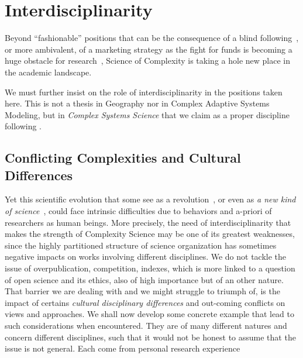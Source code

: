 \section*{Interdisciplinarity}





Beyond ``fashionable'' positions that can be the consequence of a blind following~\cite{dirk1999measure}, or more ambivalent, of a marketing strategy as the fight for funds is becoming a huge obstacle for research~\cite{bollen2014funding}, Science of Complexity is taking a hole new place in the academic landscape.


We must further insist on the role of interdisciplinarity in the positions taken here. This is not a thesis in Geography nor in Complex Adaptive Systems Modeling, but in \emph{Complex Systems Science} that we claim as a proper discipline following .



\subsection*{Conflicting Complexities and Cultural Differences}

Yet this scientific evolution that some see as a revolution~\cite{colander2003complexity}, or even as \emph{a new kind of science}~\cite{wolfram2002new}, could face intrinsic difficulties due to behaviors and a-priori of researchers as human beings. More precisely, the need of interdisciplinarity that makes the strength of Complexity Science may be one of its greatest weaknesses, since the highly partitioned structure of science organization has sometimes negative impacts on works involving different disciplines. We do not tackle the issue of overpublication, competition, indexes, which is more linked to a question of open science and its ethics, also of high importance but of an other nature. That barrier we are dealing with and we might struggle to triumph of, is the impact of certains \emph{cultural disciplinary differences} and out-coming conflicts on views and approaches. We shall now develop some concrete example that lead to such considerations when encountered. They are of many different natures and concern different disciplines, such that it would not be honest to assume that the issue is not general. Each come from personal research experience


